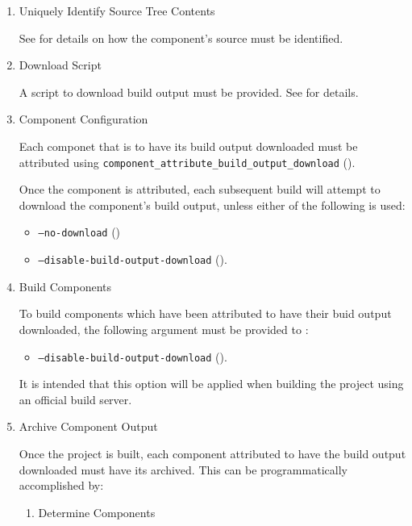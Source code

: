 \begin{enumerate}
\item{Uniquely Identify Source Tree Contents}

  See  for details on how the
  component's source must be identified.

\item{Download Script}

  A script to download build output must be provided.  See
   for details.

\item{Component Configuration}

 Each componet that is to have its build output downloaded must be
 attributed using
 \texttt{component\_attribute\_build\_output\_download}
 ().

 Once the component is attributed, each subsequent build will attempt
 to download the component's build output, unless either of the
 following is used:

 \begin{itemize}
 \item \texttt{--no-download} ()
 \item \texttt{--disable-build-output-download}
   ().
 \end{itemize}

\item{Build Components}

  To build components which have been attributed to have their buid
  output downloaded, the following argument must be provided to
  \lmsbwcmd:

 \begin{itemize}
 \item \texttt{--disable-build-output-download}
   ().
 \end{itemize}

 It is intended that this option will be applied when building the
 project using an official build server.

\item{Archive Component Output}

  Once the project is built, each component attributed to have the
  build output downloaded must have its \destdir archived.  This can
  be programmatically accomplished by:

  \begin{enumerate}
    \item{Determine Components}


\end{enumerate}
\end{enumerate}

